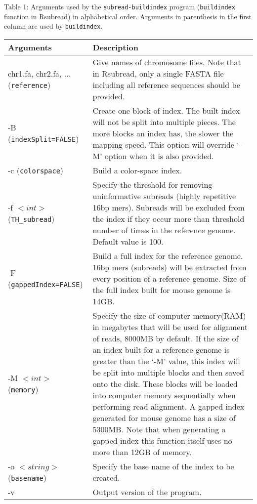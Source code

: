 \documentclass[12pt]{report}
\newcommand{\code}[1]{{\small\texttt{#1}}}
\newcommand{\Rsubread}{\textsf{Rsubread}}
\begin{document}
\begin{table}[!tpb]
\raggedright{Table 1: Arguments used by the \code{subread-buildindex} program (\code{buildindex} function in \Rsubread) in alphabetical order.
Arguments in parenthesis in the first column are used by \code{buildindex}.\newline\\}
\begin{tabular}{|p{4cm}|p{12cm}|}
\hline
Arguments & Description \\
\hline
chr1.fa, chr2.fa, ... \newline (\code{reference}) & Give names of chromosome files. Note that in {\Rsubread}, only a single FASTA file including all reference sequences should be provided.\\
\hline
-B \newline (\code{indexSplit=FALSE}) & Create one block of index. The built index will not be split into multiple pieces. The more blocks an index has, the slower the mapping speed. This option will override `-M' option when it is also provided.\\
\hline
-c \newline (\code{colorspace}) & Build a color-space index.\\
\hline
-f $<int>$ \newline (\code{TH\_subread}) & Specify the threshold for removing uninformative subreads (highly repetitive 16bp mers). Subreads will be excluded from the index if they occur more than threshold number of times in the reference genome. Default value is 100.\\
\hline
-F \newline (\code{gappedIndex=FALSE}) & Build a full index for the reference genome. 16bp mers (subreads) will be extracted from every position of a reference genome. Size of the full index built for mouse genome is 14GB.\\
\hline
-M $<int>$ \newline (\code{memory}) & Specify the size of computer memory(RAM) in megabytes that will be used for alignment of reads, 8000MB by default. If the size of an index built for a reference genome is greater than the `-M' value, this index will be split into multiple blocks and then saved onto the disk. These blocks will be loaded into computer memory sequentially when performing read alignment. A gapped index generated for mouse genome has a size of 5300MB. Note that when generating a gapped index this function itself uses no more than 12GB of memory.\\
\hline
-o $<string>$ \newline (\code{basename}) & Specify the base name of the index to be created.\\
\hline
-v & Output version of the program. \\
\hline
\end{tabular}
\end{table}
\end{document}
